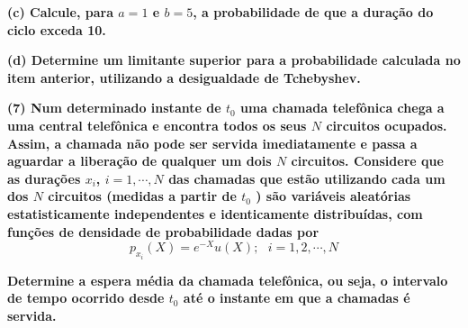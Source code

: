 \documentclass[12pt]{report}
\newenvironment{boldenv}
  {\bfseries}%
  {}%
\begin{document}
\begin{boldenv}
    (c) Calcule, para $a = 1$ e $b = 5$, a probabilidade de que a duração do ciclo exceda 10.
\end{boldenv}

\begin{boldenv}
    (d) Determine um limitante superior para a probabilidade calculada no item anterior, utilizando a desigualdade de Tchebyshev.
\end{boldenv}

\vspace{\baselineskip}


\begin{boldenv}
    (7) Num determinado instante de $t_0$ uma chamada telefônica chega a uma central
    telefônica e encontra todos os seus $N$ circuitos ocupados. Assim, a chamada não pode
    ser servida imediatamente e passa a aguardar a liberação de qualquer um dois $N$
    circuitos. Considere que as durações $x_i$, $i = 1, \cdots , N$ das chamadas que estão utilizando
    cada um dos $N$ circuitos (medidas a partir de $t_0$ ) são variáveis aleatórias estatisticamente
    independentes e identicamente distribuídas, com funções de densidade de
    probabilidade dadas por
\end{boldenv}
\[p_{x_i}(X) = e^{-X}u(X); \,\,\,\, i = 1, 2, \cdots, N\]

\begin{boldenv}
    Determine a espera média da chamada telefônica, ou seja, o intervalo de tempo
ocorrido desde $t_0$ até o instante em que a chamadas é servida.
\end{boldenv}
\end{document}
